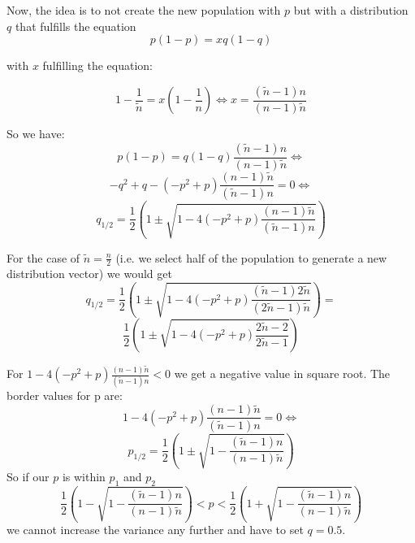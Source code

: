 \documentclass[a4paper,twoside]{report}
\begin{document}
Now, the idea is to not create the new population with \(p\) but with a distribution \(q\) that fulfills the equation 
\begin{equation}
p(1-p)=xq(1-q) 
\end{equation}

with \(x\) fulfilling the equation:

\begin{equation}
1 - \frac{1}{\tilde{n}} = x( 1 - \frac{1}{n} ) \Leftrightarrow 
x = \frac{(\tilde{n}-1)n}{(n-1)\tilde{n}}
\end{equation}

So we have:
\[
p(1-p) = q(1-q) \frac{(\tilde{n}-1)n}{(n-1)\tilde{n}} \Leftrightarrow
\]
\[
-q^2 + q - (-p^2 + p) \frac{(n-1)\tilde{n}}{(\tilde{n}-1)n} = 0 \Leftrightarrow
\]
\[
q_{1/2} = \frac{1}{2} (1 \pm \sqrt{1 - 4 (-p^2 + p) \frac{(n-1)\tilde{n}}{(\tilde{n}-1)n}})
\]

For the case of \(\tilde{n} = \frac{n}{2}\) (i.e. we select half of the population to generate a new distribution vector) we would get
\[
q_{1/2} = \frac{1}{2} (1 \pm \sqrt{1 - 4 (-p^2 + p) \frac{(\tilde{n}-1)2\tilde{n}}{(2\tilde{n}-1)\tilde{n}}}) = 
\]
\[
\frac{1}{2} (1 \pm \sqrt{1 - 4 (-p^2 + p) \frac{2\tilde{n}-2}{2\tilde{n}-1}})
\]

For \(1 - 4 (-p^2 + p) \frac{(n-1)\tilde{n}}{(\tilde{n}-1)n} < 0\) we get a negative value in square root. The border values for p are:
\[
1 - 4 (-p^2 + p) \frac{(n - 1)\tilde{n}}{(\tilde{n} - 1)n} = 0 \Leftrightarrow
\]
\[
p_{1/2} = \frac{1}{2} (1 \pm \sqrt{1 - \frac{(\tilde{n}-1)n}{(n-1)\tilde{n}}})
\]
So if our \(p\) is within \(p_{1}\) and \(p_{2}\)
\[
\frac{1}{2} (1 - \sqrt{1 - \frac{(\tilde{n}-1)n}{(n-1)\tilde{n}}}) < p < \frac{1}{2} (1 + \sqrt{1 - \frac{(\tilde{n}-1)n}{(n-1)\tilde{n}}})
\]
we cannot increase the variance any further and have to set \(q = 0.5\).
\end{document}
